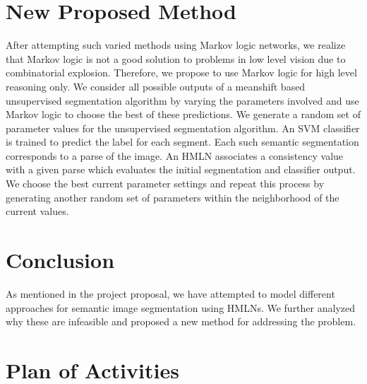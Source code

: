 \documentclass{article} %
\begin{document}
\section{New Proposed Method}
\label{sec:New}
After attempting such varied methods using Markov logic networks, we realize that Markov logic is not a good solution to problems in low level vision due to combinatorial explosion. Therefore, we propose to use Markov logic for high level reasoning only. We consider all possible outputs of a meanshift based unsupervised segmentation algorithm by varying the parameters involved and use Markov logic to choose the best of these predictions. We generate a random set of parameter values for the unsupervised segmentation algorithm. An SVM classifier is trained to predict the label for each segment. Each such semantic segmentation corresponds to a parse of the image. An HMLN associates a consistency value with a given parse which evaluates the initial segmentation and classifier output. We choose the best current parameter settings and repeat this process by generating another random set of parameters within the neighborhood of the current values.  


\section{Conclusion}
\label{sec:Conclusion}

As mentioned in the project proposal, we have attempted to model different approaches for semantic image segmentation using HMLNs. We further analyzed why these are infeasible and proposed a new method for addressing the problem.

\section{Plan of Activities}
\label{sec:Plan}



\end{document}
